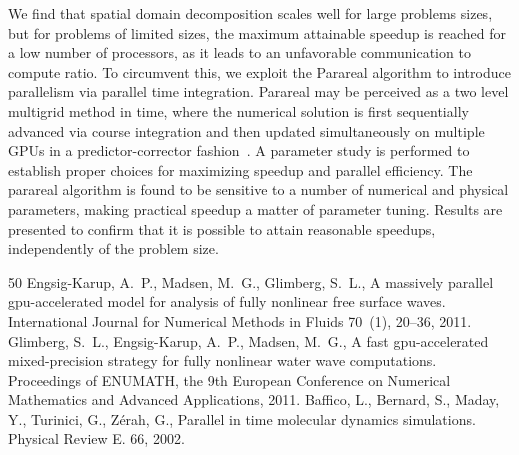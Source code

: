 \documentclass{report}
\begin{document}
We find that spatial domain decomposition scales well for large problems
sizes, but for problems of limited sizes, the maximum attainable speedup
is reached for a low number of processors, as it leads to an unfavorable
communication to compute ratio. To circumvent this, we exploit the
Parareal algorithm to introduce parallelism via parallel time
integration. Parareal may be perceived as a two level multigrid method in
time, where the numerical solution is first sequentially advanced via
course integration and then updated simultaneously on multiple GPUs in a
predictor-corrector fashion~\cite{LSY02}. A parameter study is performed
to establish proper choices for maximizing speedup and parallel
efficiency. The parareal algorithm is found to be sensitive to a number
of numerical and physical parameters, making practical speedup a matter
of parameter tuning. Results are presented to confirm that it is possible
to attain reasonable speedups, independently of the problem size.

\begin{thebibliography}{50}
Engsig-Karup, A.~P., Madsen, M.~G., Glimberg, S.~L., A massively parallel
gpu-accelerated model for analysis of fully nonlinear free surface waves.
International Journal for Numerical Methods in Fluids 70~(1), 20--36,
2011.
Glimberg, S.~L., Engsig-Karup, A.~P., Madsen, M.~G., A fast
gpu-accelerated mixed-precision strategy for fully nonlinear water wave
computations. Proceedings of ENUMATH, the 9th European Conference
on Numerical Mathematics and Advanced Applications, 2011.
Baffico, L., Bernard, S., Maday, Y., Turinici, G., Z\'{e}rah, G.,
Parallel in time molecular dynamics simulations. Physical Review E. 66,
2002.
\end{thebibliography}
\end{document}
